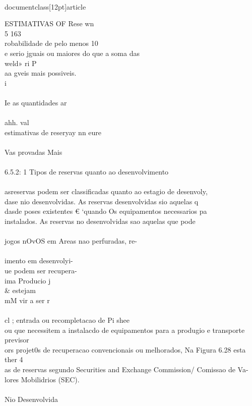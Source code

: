 \\documentclass[12pt]{article}
\begin{document}
ESTIMATIVAS OF Rese wn\\
5 163\\
robabilidade de pelo menos 10\\%
e serio jguais ou maiores do que a soma das\\
weld» ri P\\
aa gveis mais possiveis.\\
i\\
\\
Ie as quantidades ar\\
\\
ahh. val\\
estimativas de reseryay nn eure\\
\\
Vas provadas Mais\\
\\
6.5.2: 1 Tipos de reservas quanto ao desenvolvimento\\
\\
asreservas podem ser classificadas quanto ao estagio de desenvoly,\\
dase nio desenvolvidas. As reservas desenvolvidas sio aquelas q\\
dasde poses existentes € ‘quando Os equipamentos necessarios pa\\
instalados. As reservas no desenvolvidas sao aquelas que pode\\
\\
jogos nOvOS em Areas nao perfuradas, re-\\
\\
imento em desenvolyi-\\
ue podem ser recupera-\\
ima Producio j\\& estejam\\
mM vir a ser r\\
\\
cl ; entrada ou recompletacao de Pi shee\\
ou que necessitem a instalacdo de equipamentos para a produgio e transporte previsor\\
ors projet0s de recuperacao convencionais ou melhorados, Na Figura 6.28 esta ther 4\\
as de reservas segundo Securities and Exchange Commission/ Comissao de Va-\\
lores Mobilidrios (SEC).\\
\\
Nio Desenvolvida\\
\end{document}
